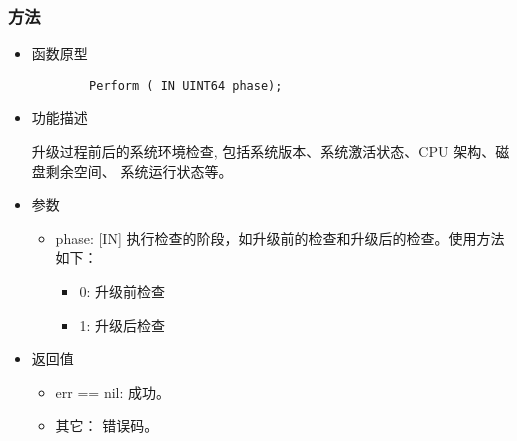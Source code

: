 \documentclass{utart}
\begin{document}
\subsubsection{方法}
\begin{itemize}
    \item 函数原型
    
    \begin{verbatim}
        Perform ( IN UINT64 phase);
      \end{verbatim}
    \item 功能描述
    
    升级过程前后的系统环境检查, 包括系统版本、系统激活状态、CPU 架构、磁盘剩余空间、
    系统运行状态等。
    \item 参数
      \begin{itemize}
          \item phase: [IN] 执行检查的阶段，如升级前的检查和升级后的检查。使用方法如下：
            \begin{itemize}
                \item 0: 升级前检查
                \item 1: 升级后检查
            \end{itemize}
      \end{itemize}
    \item 返回值
      \begin{itemize}
          \item err == nil: 成功。
          \item 其它： 错误码。
      \end{itemize}
\end{itemize}
\end{document}
